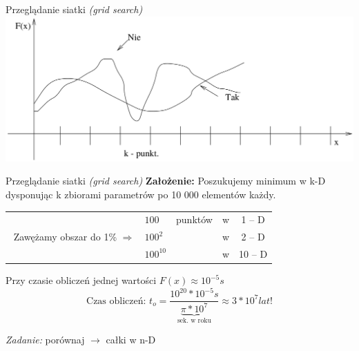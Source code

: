   \begin{frame}{Przeglądanie siatki \emph{(grid search)}}
    \includegraphics[width=1\textwidth]{img/17/przegladanie_siatki}
  \end{frame}

  \begin{frame}{Przeglądanie siatki \emph{(grid search)}}
    \textbf{Założenie:} Poszukujemy minimum w k-D dysponując k zbiorami parametrów po 10 000 elementów każdy.

    \begin{tabular}{@{} c l c c c @{}}
      & $ 100 $ & punktów & w & 1 -- D \\
      $ $ Zawężamy obszar do 1\% $ \Rightarrow $ & $ 100^{2} $ & & w & 2 -- D \\
      & $ 100^{10} $ & & w & 10 -- D \\
    \end{tabular}

    Przy czasie obliczeń jednej wartości $F(x) \approx 10^{-5}s$
    \begin{displaymath}
      \text{Czas obliczeń: } t_o = \frac{10^{20}*10^{-5}s}{\underbrace{\pi * 10^{7}}_{\text{sek. w roku}}} \approx 3 * 10^{7}lat \text{!}
    \end{displaymath}
    \begin{flushright}
      \emph{Zadanie:} porównaj $\to$ całki w n-D
    \end{flushright}
  \end{frame}

